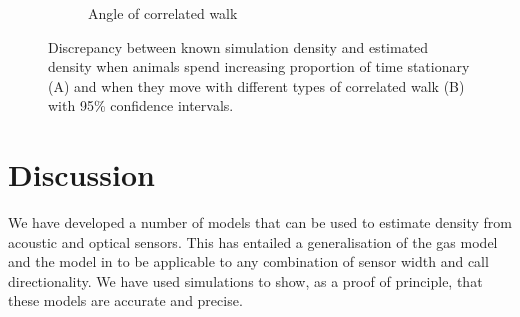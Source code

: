 \documentclass[a4paper,10pt,reqno,oneside]{amsart}
\begin{document}
\begin{figure}[t]
\begin{subfigure}[t]{0.5\textwidth}
                \caption{Angle of correlated walk}
                \label{f:Tort}
        \end{subfigure}
	\caption{Discrepancy between known simulation density and estimated density when animals spend increasing proportion of time stationary (A) and when they move with different types of correlated walk (B) with 95\% confidence intervals.}
	\label{f:distanceMovement}
\end{figure}

\section{Discussion}


We have developed a number of models that can be used to estimate density from acoustic and optical sensors. This has entailed a generalisation of the gas model and the model in \cite{rowcliffe2008estimating} to be applicable to any combination of sensor width and call directionality. We have used simulations to show, as a proof of principle, that these models are accurate and precise. %
\end{document}
